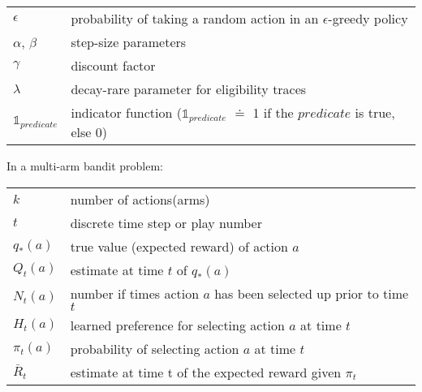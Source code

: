 \documentclass[8pt, landscape]{article}
\begin{document}
\begin{multicols}{3}
        \begin{tabular}{ p{} p{} }
            $\epsilon$               & probability of taking a random action in an $\epsilon$-greedy policy                        \\
            $\alpha$, $\beta$        & step-size parameters                                                                        \\
            $\gamma$                 & discount factor                                                                             \\
            $\lambda$                & decay-rare parameter for eligibility traces                                                 \\
            $\mathds{1}_{predicate}$ & indicator function ($\mathds{1}_{predicate}$ $\doteq$ 1 if the $predicate$ is true, else 0) \\
        \end{tabular}


        In a multi-arm bandit problem:
        \begin{tabular}{ p{} p{} }
            $k$          & number of actions(arms)                                           \\
            $t$          & discrete time step or play number                                 \\
            $q_{*}(a)$   & true value (expected reward) of action $a$                        \\
            $Q_{t}(a)$   & estimate at time $t$ of $q_{*}(a)$                                \\
            $N_{t}(a)$   & number if times action $a$ has been selected up prior to time $t$ \\
            $H_{t}(a)$   & learned preference for selecting action $a$ at time $t$           \\
            $\pi_{t}(a)$ & probability of selecting action $a$ at time $t$                   \\
            $\bar{R}_t$  & estimate at time t of the expected reward given $\pi_t$           \\
        \end{tabular}


\end{multicols}
\end{document}
